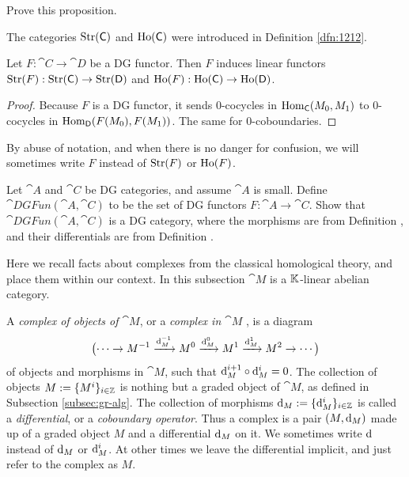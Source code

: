 \begin{exer} \label{exer:2522}
Prove this proposition.
\end{exer}

The categories $\operatorname{Str}(\operatorname{\mathsf{C}})$ and 
$\operatorname{Ho}(\operatorname{\mathsf{C}})$ were introduced in 
Definition \ref{dfn:1212}.

\begin{prop} \label{prop:1150}
Let $F : \cat{C} \to \cat{D}$ be a DG functor. Then $F$ induces linear 
functors
$\operatorname{Str}(F) : \operatorname{Str}(\operatorname{\mathsf{C}}) \to \operatorname{Str}(\operatorname{\mathsf{D}})$
and
$\operatorname{Ho}(F) : \operatorname{Ho}(\operatorname{\mathsf{C}}) \to  \operatorname{Ho}(\operatorname{\mathsf{D}})$.
\end{prop}

\begin{proof}
Because $F$ is a DG functor, it sends $0$-cocycles in 
$\operatorname{Hom}_{\operatorname{\mathsf{C}}}(M_0, M_1)$ to $0$-cocycles in 
$\operatorname{Hom}_{\operatorname{\mathsf{D}}}(F(M_0), F(M_1))$. 
The same for $0$-coboundaries.  
\end{proof}

By abuse of notation, and when there is no danger for confusion, we will 
sometimes write $F$ instead of $\operatorname{Str}(F)$ or $\operatorname{Ho}(F)$.

\begin{exer} \label{exer:1250}
Let $\cat{A}$ and $\cat{C}$ be DG categories, and assume 
$\cat{A}$ is small. Define 
$\cat{DGFun}(\cat{A}, \cat{C})$ to be the set of DG functors 
$F : \cat{A} \to \cat{C}$.
Show that $\cat{DGFun}(\cat{A}, \cat{C})$ is a DG category, 
where the morphisms are from Definition , and their 
differentials are from Definition .
\end{exer}


 \label{subsec:complexes}

Here we recall facts about complexes from the classical homological theory, and 
place them within our context. In this subsection $\cat{M}$ is a $\mathbb{K}$-linear 
abelian category. 

A {\em complex of objects of $\cat{M}$}, or a 
{\em complex in $\cat{M}$}%
,
is a diagram 
\begin{equation} \label{eqn:1065}
\bigl( \cdots \to M^{-1} \xrightarrow{\mathrm{d}_M^{-1}}  M^0 \xrightarrow{\mathrm{d}_M^0}  
M^1 \xrightarrow{\mathrm{d}_M^1} M^2 \to \cdots \bigr)
\end{equation}
of objects and morphisms in $\cat{M}$, such that $\mathrm{d}_M^{i+1} \circ \mathrm{d}_M^i = 0$.
The collection of objects $M := \{ M^i \}_{i \in \mathbb{Z}}$ 
is nothing but a graded object of $\cat{M}$, as defined in Subsection 
\ref{subsec:gr-alg}. The collection of morphisms 
$\mathrm{d}_M := \{ \mathrm{d}^i_M \}_{i \in \mathbb{Z}}$ 
is called a {\em differential}, or a {\em coboundary operator}.
Thus a complex is a pair $(M, \mathrm{d}_M)$ made up of a graded object $M$ and a 
differential $\mathrm{d}_M$ on it. 
We sometimes write $\mathrm{d}$ instead of $\mathrm{d}_M$ or $\mathrm{d}_M^i$. 
At other times we leave the differential implicit, and just refer to the 
complex as $M$. 

